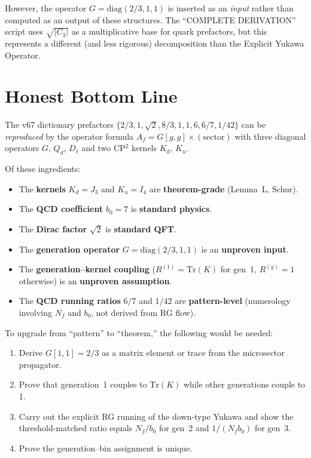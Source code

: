 \documentclass[11pt]{article}
\theoremstyle{remark}
\begin{document}
However, the operator $G = \mathrm{diag}(2/3, 1, 1)$ is inserted as an \emph{input} rather than computed as an output of these structures.  The ``COMPLETE DERIVATION'' script uses $\sqrt{|C_3|}$ as a multiplicative base for quark prefactors, but this represents a different (and less rigorous) decomposition than the Explicit Yukawa Operator.

\section{Honest Bottom Line}

The v67 dictionary prefactors $\{2/3, 1, \sqrt{2}, 8/3, 1, 1, 6, 6/7, 1/42\}$ can be \emph{reproduced} by the operator formula $A_f = G[g,g] \times (\text{sector})$ with three diagonal operators $G$, $Q_d$, $D_\ell$ and two CP$^2$ kernels $K_d$, $K_u$.

Of these ingredients:
\begin{itemize}
  \item The \textbf{kernels} $K_d = J_3$ and $K_u = I_4$ are \textbf{theorem-grade} (Lemma~L, Schur).
  \item The \textbf{QCD coefficient} $b_0 = 7$ is \textbf{standard physics}.
  \item The \textbf{Dirac factor} $\sqrt{2}$ is \textbf{standard QFT}.
  \item The \textbf{generation operator} $G = \mathrm{diag}(2/3, 1, 1)$ is an \textbf{unproven input}.
  \item The \textbf{generation--kernel coupling} ($R^{(1)} = \mathrm{Tr}(K)$ for gen~1, $R^{(g)} = 1$ otherwise) is an \textbf{unproven assumption}.
  \item The \textbf{QCD running ratios} $6/7$ and $1/42$ are \textbf{pattern-level} (numerology involving $N_f$ and $b_0$, not derived from RG flow).
\end{itemize}

\medskip
\noindent
To upgrade from ``pattern'' to ``theorem,'' the following would be needed:
\begin{enumerate}
  \item Derive $G[1,1] = 2/3$ as a matrix element or trace from the microsector propagator.
  \item Prove that generation~1 couples to $\mathrm{Tr}(K)$ while other generations couple to 1.
  \item Carry out the explicit RG running of the down-type Yukawa and show the threshold-matched ratio equals $N_f/b_0$ for gen~2 and $1/(N_f b_0)$ for gen~3.
  \item Prove the generation--bin assignment is unique.
\end{enumerate}
\end{document}
